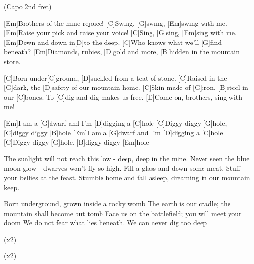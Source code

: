 
{\footnotesize(Capo 2nd fret)}

\begin{guitar}
	
	[Em]Brothers of the mine rejoice! [C]Swing, [G]swing, [Em]swing with me.
	[Em]Raise your pick and raise your voice! [C]Sing, [G]sing, [Em]sing with me.
	[Em]Down and down in[D]to the deep. [C]Who knows what we'll [G]find beneath?
	[Em]Diamonds, rubies, [D]gold and more, [B]hidden in the mountain store.
	
	[C]Born under[G]ground, [D]suckled from a teat of stone.
	[C]Raised in the [G]dark, the [D]safety of our mountain home.
	[C]Skin made of [G]iron, [B]steel in our [C]bones.
	To [C]dig and dig makes us free. [D]Come on, brothers, sing with me!
	
	[Em]I am a [G]dwarf and I'm [D]digging a [C]hole
	[C]Diggy diggy [G]hole, [C]diggy diggy [B]hole
	[Em]I am a [G]dwarf and I'm [D]digging a [C]hole
	[C]Diggy diggy [G]hole, [B]diggy diggy [Em]hole
	
	The sunlight will not reach this low - deep, deep in the mine.
	Never seen the blue moon glow - dwarves won't fly so high.
	Fill a glass and down some meat. Stuff your bellies at the feast.
	Stumble home and fall asleep, dreaming in our mountain keep.
	
	Born underground, grown inside a rocky womb
	The earth is our cradle; the mountain shall become out tomb
	Face us on the battlefield; you will meet your doom
	We do not fear what lies beneath. We can never dig too deep
	
	  (x2)
	
	 
	
	  (x2)
\end{guitar}